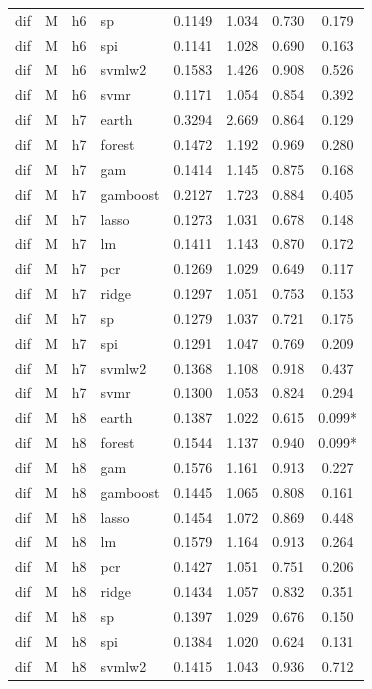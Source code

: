 \begin{ThreePartTable}
\begin{longtable}[t]{llclcccc}
dif & M & h6 & sp & 0.1149 & 1.034 & 0.730 & 0.179\\
dif & M & h6 & spi & 0.1141 & 1.028 & 0.690 & 0.163\\
dif & M & h6 & svmlw2 & 0.1583 & 1.426 & 0.908 & 0.526\\
dif & M & h6 & svmr & 0.1171 & 1.054 & 0.854 & 0.392\\
\addlinespace
dif & M & h7 & earth & 0.3294 & 2.669 & 0.864 & 0.129\\
dif & M & h7 & forest & 0.1472 & 1.192 & 0.969 & 0.280\\
dif & M & h7 & gam & 0.1414 & 1.145 & 0.875 & 0.168\\
dif & M & h7 & gamboost & 0.2127 & 1.723 & 0.884 & 0.405\\
dif & M & h7 & lasso & 0.1273 & 1.031 & 0.678 & 0.148\\
dif & M & h7 & lm & 0.1411 & 1.143 & 0.870 & 0.172\\
dif & M & h7 & pcr & 0.1269 & 1.029 & 0.649 & 0.117\\
dif & M & h7 & ridge & 0.1297 & 1.051 & 0.753 & 0.153\\
dif & M & h7 & sp & 0.1279 & 1.037 & 0.721 & 0.175\\
dif & M & h7 & spi & 0.1291 & 1.047 & 0.769 & 0.209\\
dif & M & h7 & svmlw2 & 0.1368 & 1.108 & 0.918 & 0.437\\
dif & M & h7 & svmr & 0.1300 & 1.053 & 0.824 & 0.294\\
\addlinespace
dif & M & h8 & earth & 0.1387 & 1.022 & 0.615 & 0.099*\\
dif & M & h8 & forest & 0.1544 & 1.137 & 0.940 & 0.099*\\
dif & M & h8 & gam & 0.1576 & 1.161 & 0.913 & 0.227\\
dif & M & h8 & gamboost & 0.1445 & 1.065 & 0.808 & 0.161\\
dif & M & h8 & lasso & 0.1454 & 1.072 & 0.869 & 0.448\\
dif & M & h8 & lm & 0.1579 & 1.164 & 0.913 & 0.264\\
dif & M & h8 & pcr & 0.1427 & 1.051 & 0.751 & 0.206\\
dif & M & h8 & ridge & 0.1434 & 1.057 & 0.832 & 0.351\\
dif & M & h8 & sp & 0.1397 & 1.029 & 0.676 & 0.150\\
dif & M & h8 & spi & 0.1384 & 1.020 & 0.624 & 0.131\\
dif & M & h8 & svmlw2 & 0.1415 & 1.043 & 0.936 & 0.712\\

\end{longtable}
\end{ThreePartTable}
